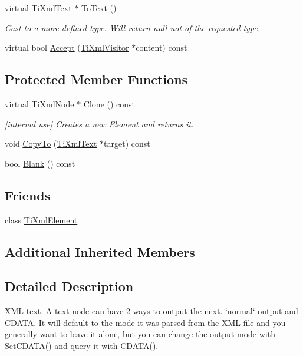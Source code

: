 \begin{DoxyCompactItemize}
virtual \hyperlink{class_ti_xml_text}{Ti\+Xml\+Text} $\ast$ \hyperlink{class_ti_xml_text_ae7c3a8fd3e4dbf6c0c4363a943d72f5b}{To\+Text} ()
\begin{DoxyCompactList}\small\item\em Cast to a more defined type. Will return null not of the requested type. \end{DoxyCompactList}\item 
virtual bool \hyperlink{class_ti_xml_text_af65964326eac4640bfb97d4622fa0de2}{Accept} (\hyperlink{class_ti_xml_visitor}{Ti\+Xml\+Visitor} $\ast$content) const
\end{DoxyCompactItemize}
\subsection*{Protected Member Functions}
\begin{DoxyCompactItemize}
\item 
virtual \hyperlink{class_ti_xml_node}{Ti\+Xml\+Node} $\ast$ \hyperlink{class_ti_xml_text_a98a20d7a4f1c1478e25e34921be24bfe}{Clone} () const
\begin{DoxyCompactList}\small\item\em \mbox{[}internal use\mbox{]} Creates a new Element and returns it. \end{DoxyCompactList}\item 
void \hyperlink{class_ti_xml_text_a480b8e0ad6b7833a73ecf2191195c9b5}{Copy\+To} (\hyperlink{class_ti_xml_text}{Ti\+Xml\+Text} $\ast$target) const
\item 
bool \hyperlink{class_ti_xml_text_a0fd9005b279def46859b72f336b158da}{Blank} () const
\end{DoxyCompactItemize}
\subsection*{Friends}
\begin{DoxyCompactItemize}
\item 
class \hyperlink{class_ti_xml_text_ab6592e32cb9132be517cc12a70564c4b}{Ti\+Xml\+Element}
\end{DoxyCompactItemize}
\subsection*{Additional Inherited Members}


\subsection{Detailed Description}
X\+ML text. A text node can have 2 ways to output the next. \char`\"{}normal\char`\"{} output and C\+D\+A\+TA. It will default to the mode it was parsed from the X\+ML file and you generally want to leave it alone, but you can change the output mode with \hyperlink{class_ti_xml_text_acb17ff7c5d09b2c839393445a3de5ea9}{Set\+C\+D\+A\+T\+A()} and query it with \hyperlink{class_ti_xml_text_aac1f4764d220ed6bf809b16dfcb6b45a}{C\+D\+A\+T\+A()}. 

